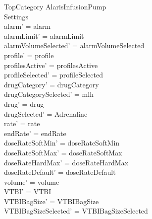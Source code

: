 \begin{schema}{TopCategory}
	\Delta AlarisInfusionPump\\
	 Settings\\
	\where
	alarm' = alarm\\
	alarmLimit' = alarmLimit\\
	alarmVolumeSelected' = alarmVolumeSelected\\
	profile' = profile\\
	profilesActive' = profilesActive\\  
	profileSelected' = profileSelected\\
	drugCategory' = drugCategory\\ 
	drugCategorySelected' = mlh\\
	drug' = drug\\ 
	drugSelected' = Adrenaline\\
	rate' = rate\\
	endRate' = endRate\\
	doseRateSoftMin' = doseRateSoftMin\\
	doseRateSoftMax' = doseRateSoftMax\\
	doseRateHardMax' = doseRateHardMax\\
	doseRateDefault' = doseRateDefault\\
	volume' = volume\\
	VTBI' = VTBI\\
	VTBIBagSize' = VTBIBagSize\\ VTBIBagSizeSelected' = VTBIBagSizeSelected\\

\end{schema}
